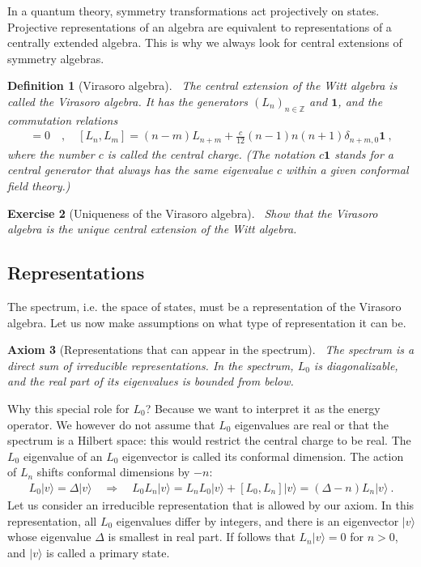 \documentclass[12pt, a4paper]{article}
\theoremstyle{break}
\newtheorem{exo}{Exercise}[section]
\newtheorem{hyp}[exo]{Axiom}
\newtheorem{defn}[exo]{Definition}
\begin{document}
In a quantum theory, symmetry transformations act projectively on states. 
Projective representations of an algebra are equivalent to representations of a centrally extended algebra. 
This is why we always look for central extensions of symmetry algebras.

\begin{defn}[Virasoro algebra]
 ~\label{def:vir}
 The central extension of the Witt algebra is called the Virasoro algebra. It has the generators $(L_n)_{n\in\mathbb{Z}}$ and $\mathbf 1$, and the commutation relations
 \begin{align}
  [\mathbf 1, L_n] = 0 \quad , \quad [L_n,L_m] = (n-m)L_{n+m} +\frac{c}{12}(n-1)n(n+1)\delta_{n+m,0}\mathbf 1 \ ,
  \label{eq:vir}
 \end{align}
 where the number $c$ is called the central charge. (The notation $c\mathbf 1$ stands for a central generator that always has the same eigenvalue $c$ within a given conformal field theory.)
\end{defn}

\begin{tcolorbox}
\begin{exo}[Uniqueness of the Virasoro algebra]
 ~\label{exo:vir}
 Show that the Virasoro algebra is the unique central extension of the Witt algebra.
\end{exo}
\end{tcolorbox}


\subsection{Representations}

The spectrum, i.e. the space of states, must be a representation of the Virasoro algebra. Let us now make assumptions on what type of representation it can be.

\begin{hyp}[Representations that can appear in the spectrum]
 ~\label{hyp:rep}
 The spectrum is a direct sum of irreducible representations. In the spectrum, $L_0$ is diagonalizable, and the real part of its eigenvalues is bounded from below.
\end{hyp}
Why this special role for $L_0$? Because we want to interpret it as the energy operator. 
We however do not assume that $L_0$ eigenvalues are real or that the spectrum is a Hilbert space: this would restrict the central charge to be real. The $L_0$ eigenvalue of an $L_0$ eigenvector is called its conformal dimension. The action of $L_n$ shifts conformal dimensions by $-n$:
\begin{align}
 L_0|v\rangle = \Delta|v\rangle \quad \Rightarrow\quad  L_0 L_n|v\rangle = L_nL_0|v\rangle + [L_0, L_n] |v\rangle  = (\Delta-n)L_n|v\rangle \ .
\end{align}
Let us consider an irreducible representation that is allowed by our axiom. In this representation, all $L_0$ eigenvalues differ by integers, and there is an eigenvector $|v\rangle$ whose eigenvalue $\Delta$ is smallest in real part. 
If follows that $L_n|v\rangle =0$ for $n>0$, and $|v\rangle $ is called a primary state.
\end{document}
